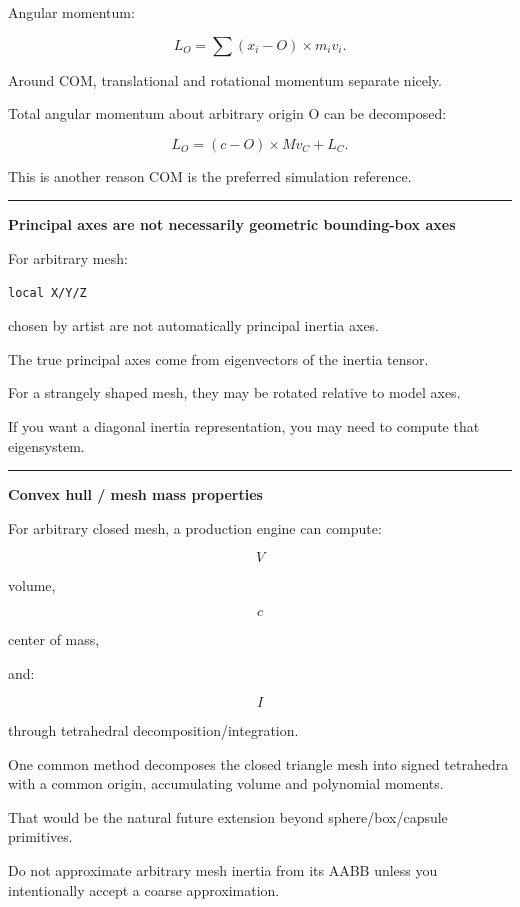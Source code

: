 Angular momentum:

\[
L_O
=
\sum
(x_i-O)
\times
m_iv_i.
\]

Around COM, translational and rotational momentum separate nicely.

Total angular momentum about arbitrary origin O can be decomposed:

\[
\boxed{
L_O
=
(c-O)\times Mv_C
+
L_C.
}
\]

This is another reason COM is the preferred simulation reference.

\begin{center}\rule{0.5\linewidth}{0.5pt}\end{center}

\textbf{Principal axes are not necessarily geometric bounding-box axes}

For arbitrary mesh:

\begin{verbatim}
local X/Y/Z
\end{verbatim}

chosen by artist are not automatically principal inertia axes.

The true principal axes come from eigenvectors of the inertia tensor.

For a strangely shaped mesh, they may be rotated relative to model axes.

If you want a diagonal inertia representation, you may need to compute that eigensystem.

\begin{center}\rule{0.5\linewidth}{0.5pt}\end{center}

\textbf{Convex hull / mesh mass properties}

For arbitrary closed mesh, a production engine can compute:

\[
V
\]

volume,

\[
c
\]

center of mass,

and:

\[
I
\]

through tetrahedral decomposition/integration.

One common method decomposes the closed triangle mesh into signed tetrahedra with a common origin, accumulating volume and polynomial moments.

That would be the natural future extension beyond sphere/box/capsule primitives.

Do not approximate arbitrary mesh inertia from its AABB unless you intentionally accept a coarse approximation.


